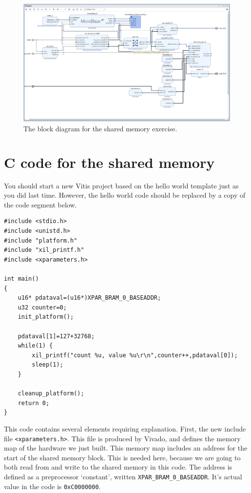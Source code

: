 \documentclass[../physical_computing.tex]{subfiles}
\begin{document}
\begin{figure}
    \centering
    \includegraphics[width=\textwidth]{appendix_9/figures/full_diagram.png}
    \caption{The block diagram for the shared memory exercise.}
    \label{fig:appendix_8_hardware}
\end{figure}

\section{C code for the shared memory}

You should start a new Vitis project based on the hello world template just as you did last time. However, the hello world code should be replaced by a copy of the code segment below.

\newpage

\begin{verbatim}
#include <stdio.h>
#include <unistd.h>
#include "platform.h"
#include "xil_printf.h"
#include <xparameters.h>

int main()
{
	u16* pdataval=(u16*)XPAR_BRAM_0_BASEADDR;
	u32 counter=0;
    init_platform();

    pdataval[1]=127+32768;
    while(1) {
    	xil_printf("count %u, value %u\r\n",counter++,pdataval[0]);
    	sleep(1);
    }

    cleanup_platform();
    return 0;
}
\end{verbatim}

This code contains several elements requiring explanation. First, the new include file \texttt{<xparameters.h>}. This file is produced by Vivado, and defines the memory
map of the hardware we just built. This memory map includes an address for the start of the shared memory block. This is needed here, because we are going to both read
from and write to the shared memory in this code. The address is defined as a preprocessor `constant', written \texttt{XPAR\_BRAM\_0\_BASEADDR}. It's actual value in 
the code is \texttt{0xC0000000}. 
\end{document}
